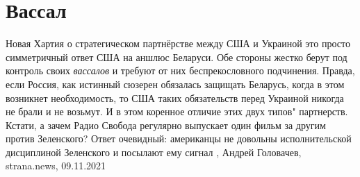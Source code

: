  
 
 
 
 
\chapter{Вассал}
\label{sec:slova.vassal}

Новая Хартия о стратегическом партнёрстве между США и Украиной это просто
симметричный ответ США на аншлюс Беларуси. Обе стороны жестко берут под
контроль своих \emph{вассалов} и требуют от них беспрекословного подчинения.
Правда, если Россия, как истинный сюзерен обязалась защищать Беларусь, когда в
этом возникнет необходимость, то США таких обязательств перед Украиной никогда
не брали и не возьмут. И в этом коренное отличие этих двух типов" партнерств.
Кстати, а зачем Радио Свобода регулярно выпускает один фильм за другим против
Зеленского? Ответ очевидный: американцы не довольны исполнительской дисциплиной
Зеленского и посылают ему сигнал
, 
Андрей Головачев, strana.news, 09.11.2021
